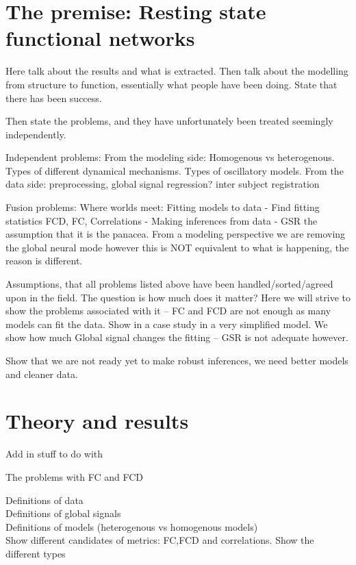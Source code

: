 \documentclass[oneside]{zHenriquesLab-StyleBioRxiv}
\begin{document}
\section*{The premise: Resting state functional networks}

Here talk about the results and what is extracted. Then talk about the modelling from structure to function, essentially what people have been doing. State that there has been success. 

Then state the problems, and they have unfortunately been treated seemingly independently.

Independent problems:
From the modeling side: Homogenous vs heterogenous. Types of different dynamical mechanisms. Types of oscillatory models.
From the data side: preprocessing, global signal regression? inter subject registration

Fusion problems:
Where worlds meet:
Fitting models to data
- Find fitting statistics FCD, FC, Correlations
- Making inferences from data
- GSR the assumption that it is the panacea. From a modeling perspective we are removing the global neural mode however this is NOT equivalent to what is happening, the reason is different. 

Assumptions, that all problems listed above have been handled/sorted/agreed upon in the field. The question is how much does it matter? Here we will strive to show the problems associated with it -- FC and FCD are not enough as many models can fit the data. Show in a case study in a very simplified model. We show how much Global signal changes the fitting -- GSR is not adequate however. 

Show that we are not ready yet to make robust inferences, we need better models and cleaner data.

\section*{Theory and results}

Add in stuff to do with 

The problems with FC and FCD

Definitions of data \\
Definitions of global signals \\
Definitions of models (heterogenous vs homogenous models) \\
Show different candidates of metrics: FC,FCD and correlations.
Show the different types \\
\end{document}

